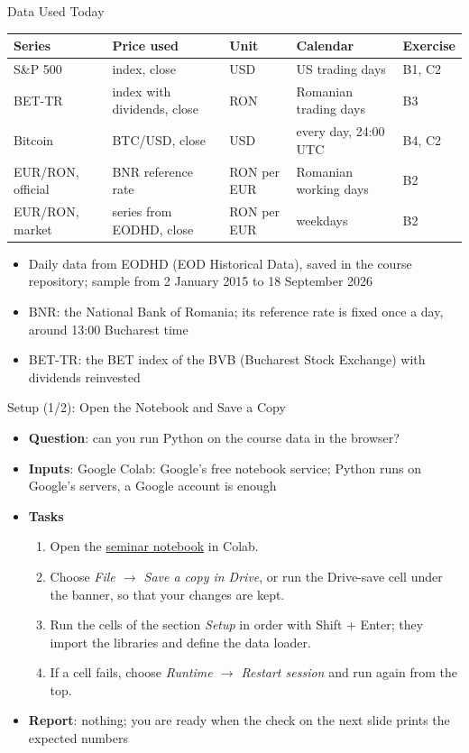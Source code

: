 \begin{frame}{Data Used Today}
\itemsize{\footnotesize}
\begin{center}
\footnotesize
\begin{tabular}{>{\raggedright\arraybackslash}p{2.2cm}>{\raggedright\arraybackslash}p{3.6cm}>{\raggedright\arraybackslash}p{1.6cm}>{\raggedright\arraybackslash}p{3.4cm}l}
\toprule
\textbf{Series} & \textbf{Price used} & \textbf{Unit} & \textbf{Calendar} & \textbf{Exercise} \\
\midrule
S\&P 500 & index, close & USD & US trading days & B1, C2 \\
BET-TR & index with dividends, close & RON & Romanian trading days & B3 \\
Bitcoin & BTC/USD, close & USD & every day, 24:00 UTC & B4, C2 \\
EUR/RON, official & BNR reference rate & RON per EUR & Romanian working days & B2 \\
EUR/RON, market & series from EODHD, close & RON per EUR & weekdays & B2 \\
\bottomrule
\end{tabular}
\end{center}
\begin{itemize}
    \item Daily data from EODHD (EOD Historical Data), saved in the course repository; sample from 2 January 2015 to 18 September 2026
    \item BNR: the National Bank of Romania; its reference rate is fixed once a day, around 13:00 Bucharest time
    \item BET-TR: the BET index of the BVB (Bucharest Stock Exchange) with dividends reinvested
\end{itemize}
\end{frame}

\begin{frame}{Setup (1/2): Open the Notebook and Save a Copy}
\itemsize{\small}
\begin{itemize}
\item \textbf{Question}: can you run Python on the course data in the browser?
\item \textbf{Inputs}: Google Colab: Google's free notebook service; Python runs on Google's servers, a Google account is enough
\item \textbf{Tasks}
\begin{enumerate}
    \item Open the \href{\nb}{seminar notebook} in Colab.
    \item Choose \emph{File $\to$ Save a copy in Drive}, or run the Drive-save cell under the banner, so that your changes are kept.
    \item Run the cells of the section \emph{Setup} in order with Shift + Enter; they import the libraries and define the data loader.
    \item If a cell fails, choose \emph{Runtime $\to$ Restart session} and run again from the top.
\end{enumerate}
\item \textbf{Report}: nothing; you are ready when the check on the next slide prints the expected numbers
\end{itemize}
\end{frame}

